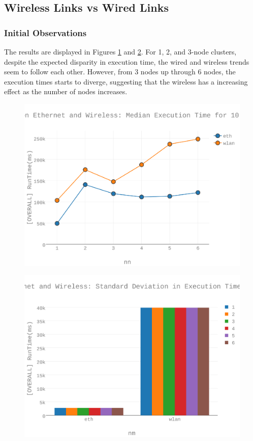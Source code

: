 \subsection{Wireless Links vs Wired Links}
\subsubsection{Initial Observations}
The results are displayed in Figures \ref{figures-wli_fig7} and \ref{figures-wli_fig9}.  For 1, 2, and 3-node clusters, despite the expected  disparity in execution time, the wired and wireless trends seem to follow each other.  However, from 3 nodes up through 6 nodes, the execution times starts to diverge, suggesting that the wireless has a increasing effect as the number of nodes increases. \begin{figure}[h]
\includegraphics[width=5.5in]{Figures/figures-wli_fig7.pdf}
\caption{}
\label{figures-wli_fig7}
\end{figure}

\begin{figure}[h]
\includegraphics[width=5.5in]{Figures/figures-wli_fig9.pdf}
\caption{}
\label{figures-wli_fig9}
\end{figure}



